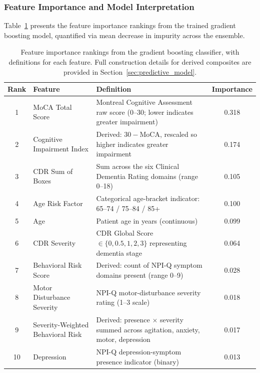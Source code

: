 \documentclass[11pt,a4paper]{article}
\begin{document}
\subsubsection{Feature Importance and Model Interpretation}

Table~\ref{tab:feature_importance} presents the feature importance rankings from the trained gradient boosting model, quantified via mean decrease in impurity across the ensemble.

\begin{table}[htbp]
\centering
\caption{Feature importance rankings from the gradient boosting classifier, with definitions for each feature. Full construction details for derived composites are provided in Section~\ref{sec:predictive_model}.}
\label{tab:feature_importance}
\begin{tabular}{@{}clp{7.2cm}c@{}}
\toprule
\textbf{Rank} & \textbf{Feature} & \textbf{Definition} & \textbf{Importance} \\
\midrule
1 & MoCA Total Score & Montreal Cognitive Assessment raw score (0--30; lower indicates greater impairment) & 0.318 \\
2 & Cognitive Impairment Index & Derived: $30 - \text{MoCA}$, rescaled so higher indicates greater impairment & 0.174 \\
3 & CDR Sum of Boxes & Sum across the six Clinical Dementia Rating domains (range 0--18) & 0.105 \\
4 & Age Risk Factor & Categorical age-bracket indicator: 65--74 / 75--84 / 85+ & 0.100 \\
5 & Age & Patient age in years (continuous) & 0.099 \\
6 & CDR Severity & CDR Global Score $\in \{0, 0.5, 1, 2, 3\}$ representing dementia stage & 0.064 \\
7 & Behavioral Risk Score & Derived: count of NPI-Q symptom domains present (range 0--9) & 0.028 \\
8 & Motor Disturbance Severity & NPI-Q motor-disturbance severity rating (1--3 scale) & 0.018 \\
9 & Severity-Weighted Behavioral Risk & Derived: presence $\times$ severity summed across agitation, anxiety, motor, depression & 0.017 \\
10 & Depression & NPI-Q depression-symptom presence indicator (binary) & 0.013 \\
\bottomrule
\end{tabular}
\end{table}
\end{document}
